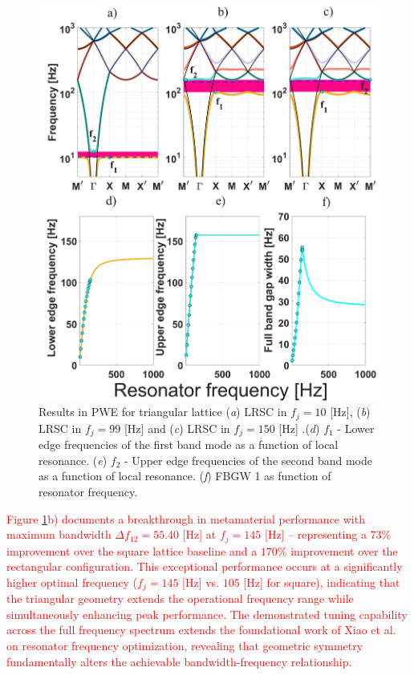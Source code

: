 \documentclass[review,numbers,sort&compress]{elsarticle}
\begin{document}
\begin{figure}[htb]
	\centering
	\includegraphics[width=.9\textwidth]{2_3_disp_frf_trian.pdf}
	\caption{Results in PWE for triangular lattice (\textit{a}) LRSC in $f_j=10$ [Hz], (\textit{b}) LRSC in $f_j=99$ [Hz] and (\textit{c}) LRSC in $f_j=150$ [Hz] .(\textit{d}) $f_1$ - Lower edge frequencies of the first band mode as a function of local resonance. (\textit{e}) $f_2$ - Upper edge frequencies of the second band mode as a function of local resonance. (\textit{f}) FBGW 1 as function of resonator frequency.}
	\label{pwe_disp_trian_all_res}
\end{figure}

\textcolor{red}{Figure \ref{pwe_disp_trian_all_res}b) documents a breakthrough in metamaterial performance with maximum bandwidth $\Delta f_{12} = 55.40$ [Hz] at $f_j = 145$ [Hz] – representing a $73\%$ improvement over the square lattice baseline and a $170\%$ improvement over the rectangular configuration. This exceptional performance occurs at a significantly higher optimal frequency ($f_j = 145$ [Hz] vs. $105$ [Hz] for square), indicating that the triangular geometry extends the operational frequency range while simultaneously enhancing peak performance. The demonstrated tuning capability across the full frequency spectrum extends the foundational work of Xiao et al.~\cite{Xiao_2012} on resonator frequency optimization, revealing that geometric symmetry fundamentally alters the achievable bandwidth-frequency relationship.}
\end{document}
